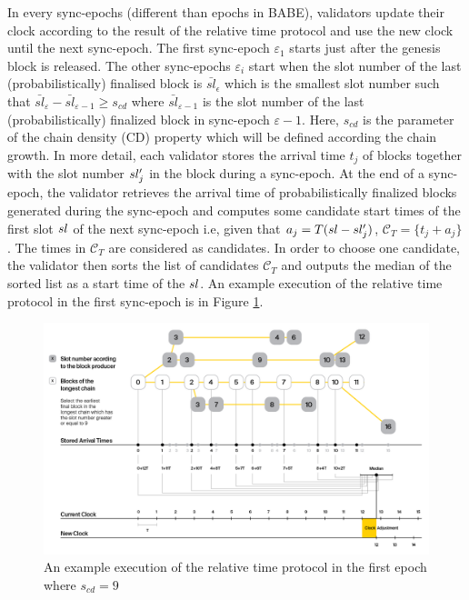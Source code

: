 In every sync-epochs (different than epochs in BABE), validators update their clock according to the result of the relative time protocol and use the new clock until the next sync-epoch. The first sync-epoch $\varepsilon_1$ starts just after the genesis block is released. The other sync-epochs  $\varepsilon_i$ start when the slot number of the last (probabilistically) finalised block is $\bar{sl}_{\epsilon}$ which is the smallest slot number such that  $\bar{sl}_{\varepsilon} - \bar{sl}_{\varepsilon-1} \geq s_{cd}$ where $\bar{sl}_{\varepsilon-1}$ is the slot number of the last (probabilistically) finalized block in sync-epoch $\varepsilon-1$. Here, $s_{cd}$ is the parameter of the chain density (CD) property which will be defined according the chain growth.
In more detail, each validator  stores  the arrival time $ t_j $ of  blocks together with the slot number $sl'_j$ in the block during a sync-epoch. At the end of a sync-epoch, the validator retrieves the arrival time of probabilistically finalized blocks generated during the sync-epoch and computes some candidate start times of the first slot $ sl $ of the next sync-epoch i.e,  given that $ a_j = T(sl - sl'_j)  $,  $\mathcal{C}_T = \{t_j+a_j \}$. The times in $ \mathcal{C}_T $ are considered as candidates. In order to  choose one candidate,  the validator then sorts the list of candidates $ \mathcal{C}_T $ and outputs the median of the sorted list as a start time of the $ sl $. An example execution of the relative time protocol in the first sync-epoch is in Figure \ref{fig:relativetime}.

\begin{figure}[h]
	\centering
	\includegraphics[width=1.\textwidth]{images/BABE3.png}
	\caption{An example execution of the relative time protocol in the first epoch where $s_{cd} = 9$}
	\label{fig:relativetime}
\end{figure}

